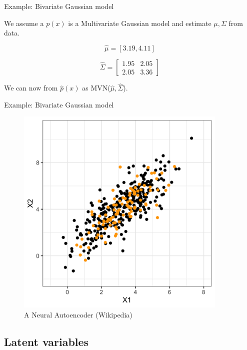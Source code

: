\documentclass[10pt]{beamer}
\begin{document}
\begin{frame}{Example: Bivariate Gaussian model}

We assume a $p(x)$ is a Multivariate Gaussian model and estimate $\mu,\Sigma$ from data.
\pause

\[
\hat{\mu} = [3.19, 4.11]
\]

\[
\hat{\Sigma} = \begin{bmatrix} 1.95 & 2.05\\ 2.05 & 3.36 \end{bmatrix}
\]

We can now  from $\hat{p}(x)$ as MVN($\hat{\mu},\hat{\Sigma}$).

\end{frame}

\begin{frame}{Example: Bivariate Gaussian model}

\begin{figure}[h]
\centering
\includegraphics[width=0.9\textwidth]{fig/bi_model.png}
\caption{A Neural Autoencoder (Wikipedia)}
\end{figure}

\end{frame}




\subsection{Latent variables}
\end{document}
